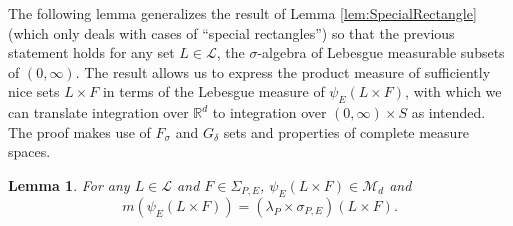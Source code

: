 \documentclass[11pt, letter]{book}
\newtheorem{lemma}[theorem]{Lemma}
\begin{document}
\noindent The following lemma generalizes the result of Lemma \ref{lem:SpecialRectangle} (which only deals with cases of ``special rectangles'') so that the previous statement holds for any set $L \in \mathcal{L}$, the $\sigma$-algebra of Lebesgue measurable subsets of $(0,\infty)$. The result allows us to express the product measure of sufficiently nice sets $L\times F$ in terms of the Lebesgue measure of $\psi_E(L\times F)$, with which we can translate integration over $\mathbb{R}^d$ to integration over $(0,\infty)\times S$ as intended. The proof makes use of $F_\sigma$ and $G_\delta$ sets and properties of complete measure spaces.
\begin{framed}
\begin{lemma}\label{lem:AllMeasurableRectangles} For any $L\in\mathcal{L}$ and $F\in \Sigma_{P,E}$, $\psi_E(L\times F)\in\mathcal{M}_d$ and 
\begin{equation*}
m(\psi_E(L\times F))=(\lambda_P\times\sigma_{P,E})(L\times F).
\end{equation*}
\end{lemma}
\end{framed}
\end{document}
